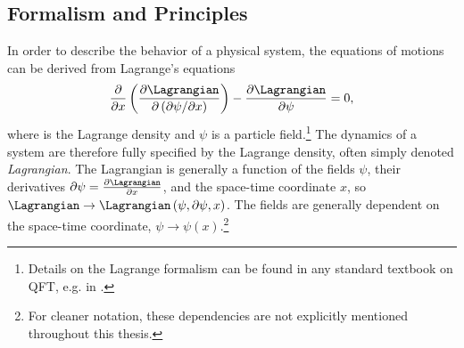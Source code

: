 \subsection{Formalism and Principles}
\label{subsec:formalism}


In order to describe the behavior of a physical system, the equations of motions can be derived from Lagrange's equations
\begin{equation}
  \label{eq:euler-lagrange}
  \frac{\partial}{\partial x} \left( \frac{\partial \Lagrangian}{\partial \left(\partial \psi / \partial x \right) } \right) - \frac{\partial \Lagrangian}{\partial \psi} = 0,
\end{equation}
where \Lagrangian is the Lagrange density and $\psi$ is a particle field.\footnote{Details on the Lagrange formalism can be found in any standard textbook on QFT, e.g. in .}
The dynamics of a system are therefore fully specified by the Lagrange density, often simply denoted \emph{Lagrangian}. 
The Lagrangian is generally a function of the fields $\psi$, their derivatives $\partial \psi = \frac{\partial \Lagrangian}{\partial x}$, and the space-time coordinate $x$, so $\Lagrangian \to \Lagrangian \left( \psi, \partial \psi, x \right)$. 
The fields are generally dependent on the space-time coordinate, $\psi \rightarrow \psi(x)$.\footnote{For cleaner notation, these dependencies are not explicitly mentioned throughout this thesis.}

